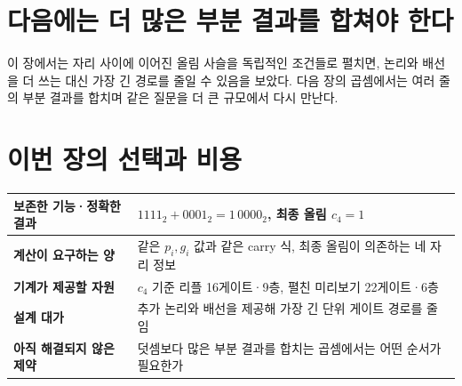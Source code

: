 \section{다음에는 더 많은 부분 결과를 합쳐야 한다}

이 장에서는 자리 사이에 이어진 올림 사슬을 독립적인 조건들로 펼치면, 논리와 배선을 더 쓰는 대신 가장 긴 경로를 줄일 수 있음을 보았다. 다음 장의 곱셈에서는 여러 줄의 부분 결과를 합치며 같은 질문을 더 큰 규모에서 다시 만난다.

\section*{이번 장의 선택과 비용}

\begin{center}
\small
\begin{tabular}{>{\raggedright\arraybackslash\sffamily\bfseries}p{} >{\raggedright\arraybackslash}p{}}
\toprule
보존한 기능·정확한 결과 & \(1111_2+0001_2=1\,0000_2\), 최종 올림 \(c_4=1\) \\
\midrule
계산이 요구하는 양 & 같은 \(p_i,g_i\) 값과 같은 carry 식, 최종 올림이 의존하는 네 자리 정보 \\
\midrule
기계가 제공할 자원 & \(c_4\) 기준 리플 16게이트·9층, 펼친 미리보기 22게이트·6층 \\
\midrule
설계 대가 & 추가 논리와 배선을 제공해 가장 긴 단위 게이트 경로를 줄임 \\
\midrule
아직 해결되지 않은 제약 & 덧셈보다 많은 부분 결과를 합치는 곱셈에서는 어떤 순서가 필요한가 \\
\bottomrule
\end{tabular}
\end{center}
